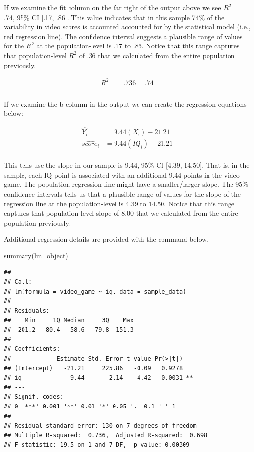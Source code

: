 \documentclass[
]{krantz}
\makeatletter
\newenvironment{Shaded}{\begin{snugshade}}{\end{snugshade}}
\newcommand{\FunctionTok}[1]{\textcolor[rgb]{0,0,0}{#1}}
\newcommand{\NormalTok}[1]{#1}
\newenvironment{kframe}{%
\medskip{}
\setlength{\fboxsep}{.8em}
 \def\at@end@of@kframe{}%
 \ifinner\ifhmode%
  \def\at@end@of@kframe{\end{minipage}}%
  \begin{minipage}{\columnwidth}%
 \fi\fi%
 \def\FrameCommand##1{\hskip\@totalleftmargin \hskip-\fboxsep
 \colorbox{shadecolor}{##1}\hskip-\fboxsep
     \hskip-\linewidth \hskip-\@totalleftmargin \hskip\columnwidth}%
 \MakeFramed {\advance\hsize-\width
   \@totalleftmargin\z@ \linewidth\hsize
   \@setminipage}}%
 {\par\unskip\endMakeFramed%
 \at@end@of@kframe}
\renewenvironment{Shaded}{\begin{kframe}}{\end{kframe}}
\makeatother
\begin{document}
If we examine the fit column on the far right of the output above we see \(R^2\) = .74, 95\% CI {[}.17, .86{]}. This value indicates that in this sample 74\% of the variability in video scores is accounted accounted for by the statistical model (i.e., red regression line). The confidence interval suggests a plausible range of values for the \(R^2\) at the population-level is .17 to .86. Notice that this range captures that population-level \(R^2\) of .36 that we calculated from the entire population previously.

\[
\begin{aligned}
R^2 &= .736 = .74\\\\ 
\end{aligned}
\]

If we examine the b column in the output we can create the regression equations below:

\[
\begin{aligned}
\hat{Y_i} &= 9.44(X_i) -21.21 \\
\widehat{score_i} &= 9.44(IQ_i) -21.21\\
\end{aligned}
\]

This tells use the slope in our sample is 9.44, 95\% CI {[}4.39, 14.50{]}. That is, in the sample, each IQ point is associated with an additional 9.44 points in the video game. The population regression line might have a smaller/larger slope. The 95\% confidence intervals tells us that a plausible range of values for the slope of the regression line at the population-level is 4.39 to 14.50. Notice that this range captures that population-level slope of 8.00 that we calculated from the entire population previously.

Additional regression details are provided with the command below.

\begin{Shaded}
\begin{Highlighting}[]
\FunctionTok{summary}\NormalTok{(lm\_object)}
\end{Highlighting}
\end{Shaded}

\begin{verbatim}
## 
## Call:
## lm(formula = video_game ~ iq, data = sample_data)
## 
## Residuals:
##    Min     1Q Median     3Q    Max 
## -201.2  -80.4   58.6   79.8  151.3 
## 
## Coefficients:
##             Estimate Std. Error t value Pr(>|t|)   
## (Intercept)   -21.21     225.86   -0.09   0.9278   
## iq              9.44       2.14    4.42   0.0031 **
## ---
## Signif. codes:  
## 0 '***' 0.001 '**' 0.01 '*' 0.05 '.' 0.1 ' ' 1
## 
## Residual standard error: 130 on 7 degrees of freedom
## Multiple R-squared:  0.736,  Adjusted R-squared:  0.698 
## F-statistic: 19.5 on 1 and 7 DF,  p-value: 0.00309
\end{verbatim}
\end{document}
